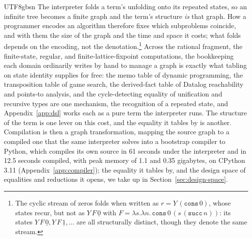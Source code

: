 \begin{CJK*}{UTF8}{gbsn}
  The interpreter folds a term's unfolding onto its repeated states, so an infinite tree becomes a finite graph and the term's structure \emph{is} that graph. How a programmer encodes an algorithm therefore fixes which subproblems coincide, and with them the size of the graph and the time and space it costs; what folds depends on the encoding, not the denotation.\footnote{The cyclic stream of zeros folds when written as $r = Y\,(\mathtt{cons}\,0)$, whose states recur, but not as $Y\,F\,\underline{0}$ with $F = \lambda s.\lambda n.\,\mathtt{cons}\,0\,(s\,(\mathtt{succ}\,n))$: its states $Y\,F\,\underline{0}, Y\,F\,\underline{1}, \dots$ are all structurally distinct, though they denote the same stream.} Across the rational fragment, the finite-state, regular, and finite-lattice-fixpoint computations, the bookkeeping each domain ordinarily writes by hand to manage a graph is exactly what tabling on state identity supplies for free: the memo table of dynamic programming, the transposition table of game search, the derived-fact table of Datalog reachability and points-to analysis, and the cycle-detecting equality of unification and recursive types are one mechanism, the recognition of a repeated state, and Appendix~\ref{app:dsl} works each as a pure term the interpreter runs. The structure of the term is one lever on this cost, and the equality it tables by is another. Compilation is then a graph transformation, mapping the source graph to a compiled one that the same interpreter solves into a bootstrap compiler to Python, which compiles its own source in 61 seconds under the interpreter and in 12.5 seconds compiled, with peak memory of 1.1 and 0.35 gigabytes, on CPython 3.11 (Appendix~\ref{app:compiler}); the equality it tables by, and the design space of equalities and reductions it opens, we take up in Section~\ref{sec:design-space}.
  \fi


\end{CJK*}
